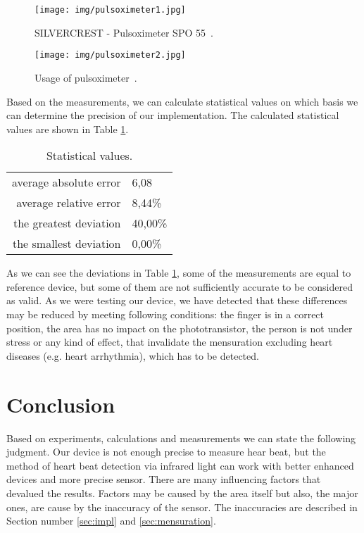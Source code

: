 \documentclass[11pt,a4paper]{article}
\begin{document}
\newpage

\begin{figure}[H]
    \centering
    \texttt{[image: img/pulsoximeter1.jpg]}
    \caption{SILVERCREST - Pulsoximeter SPO 55~\cite{IMG-PULSOXIMETER-1}.}
    \label{fig:pulsoximeter1}
\end{figure}

\begin{figure}[H]
    \centering
    \texttt{[image: img/pulsoximeter2.jpg]}
    \caption{Usage of pulsoximeter~\cite{IMG-PULSOXIMETER-2}.}
    \label{fig:pulsoximeter2}
\end{figure}

Based on the measurements, we can calculate statistical values on which basis we can determine the precision of our implementation. The calculated statistical values are shown in Table \ref{tab:stats}.\\

\begin{table}[H]
  \begin{center}
    \begin{tabular}{r|l}
      average absolute error & 6,08\\
      average relative error & 8,44\%\\
      the greatest deviation & 40,00\%\\
      the smallest deviation & 0,00\%\\
    \end{tabular}
    \caption{Statistical values.}
    \label{tab:stats}
  \end{center}
\end{table}

As we can see the deviations in Table \ref{tab:stats}, some of the measurements are equal to reference device, but some of them are not sufficiently accurate to be considered as valid. As we were testing our device, we have detected that these differences may be reduced by meeting following conditions: the finger is in a correct position, the area has no impact on the phototransistor, the person is not under stress or any kind of effect, that invalidate the mensuration excluding heart diseases (e.g. heart arrhythmia), which has to be detected.

\section{Conclusion}
Based on experiments, calculations and measurements we can state the following judgment. Our device is not enough precise to measure hear beat, but the method of heart beat detection via infrared light can work with better enhanced devices and more precise sensor. There are many influencing factors that devalued the results. Factors may be caused by the area itself but also, the major ones, are cause by the inaccuracy of the sensor. The inaccuracies are described in Section number \ref{sec:impl} and \ref{sec:mensuration}.\\
\end{document}
